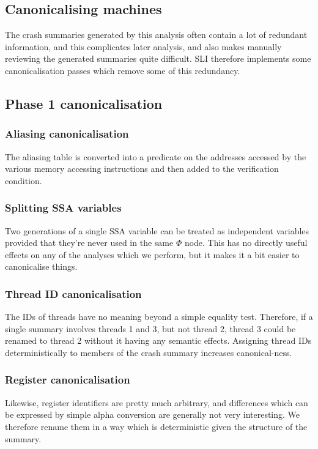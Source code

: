 \documentclass[12pt,a4paper]{book}
\begin{document}
\subsection{Canonicalising machines}

The crash summaries generated by this analysis often contain a lot of redundant information, and this complicates later analysis, and also makes manually reviewing the generated summaries quite difficult.
SLI therefore implements some canonicalisation passes which remove some of this redundancy.


\subsection{Phase 1 canonicalisation}
\subsubsection{Aliasing canonicalisation}
The aliasing table is converted into a predicate on the addresses accessed by the various memory accessing instructions and then added to the verification condition.

\subsubsection{Splitting SSA variables}
Two generations of a single SSA variable can be treated as independent variables provided that they're never used in the same $\Phi$ node.
This has no directly useful effects on any of the analyses which we perform, but it makes it a bit easier to canonicalise things.

\subsubsection{Thread ID canonicalisation}
The IDs of threads have no meaning beyond a simple equality test.
Therefore, if a single summary involves threads 1 and 3, but not thread 2, thread 3 could be renamed to thread 2 without it having any semantic effects.
Assigning thread IDs deterministically to members of the crash summary increases canonical-ness.

\subsubsection{Register canonicalisation}
Likewise, register identifiers are pretty much arbitrary, and differences which can be expressed by simple alpha conversion are generally not very interesting.
We therefore rename them in a way which is deterministic given the structure of the summary.
\end{document}
